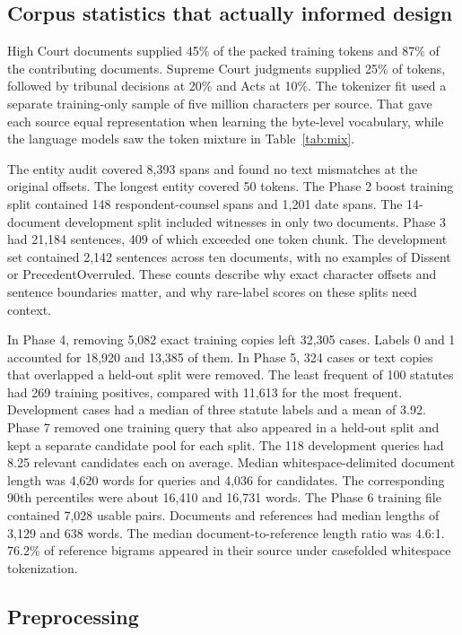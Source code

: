 \documentclass[11pt, oneside]{article}
\begin{document}
\subsection{Corpus statistics that actually informed design}

High Court documents supplied 45\% of the packed training tokens and 87\% of the contributing documents. Supreme Court judgments supplied 25\% of tokens, followed by tribunal decisions at 20\% and Acts at 10\%. The tokenizer fit used a separate training-only sample of five million characters per source. That gave each source equal representation when learning the byte-level vocabulary, while the language models saw the token mixture in Table~\ref{tab:mix}.

The entity audit covered 8,393 spans and found no text mismatches at the original offsets. The longest entity covered 50 tokens. The Phase 2 boost training split contained 148 respondent-counsel spans and 1,201 date spans. The 14-document development split included witnesses in only two documents. Phase 3 had 21,184 sentences, 409 of which exceeded one token chunk. The development set contained 2,142 sentences across ten documents, with no examples of Dissent or PrecedentOverruled. These counts describe why exact character offsets and sentence boundaries matter, and why rare-label scores on these splits need context.

In Phase 4, removing 5,082 exact training copies left 32,305 cases. Labels 0 and 1 accounted for 18,920 and 13,385 of them. In Phase 5, 324 cases or text copies that overlapped a held-out split were removed. The least frequent of 100 statutes had 269 training positives, compared with 11,613 for the most frequent. Development cases had a median of three statute labels and a mean of 3.92. Phase 7 removed one training query that also appeared in a held-out split and kept a separate candidate pool for each split. The 118 development queries had 8.25 relevant candidates each on average. Median whitespace-delimited document length was 4,620 words for queries and 4,036 for candidates. The corresponding 90th percentiles were about 16,410 and 16,731 words. The Phase 6 training file contained 7,028 usable pairs. Documents and references had median lengths of 3,129 and 638 words. The median document-to-reference length ratio was 4.6:1. 76.2\% of reference bigrams appeared in their source under casefolded whitespace tokenization.

\subsection{Preprocessing}
\end{document}
